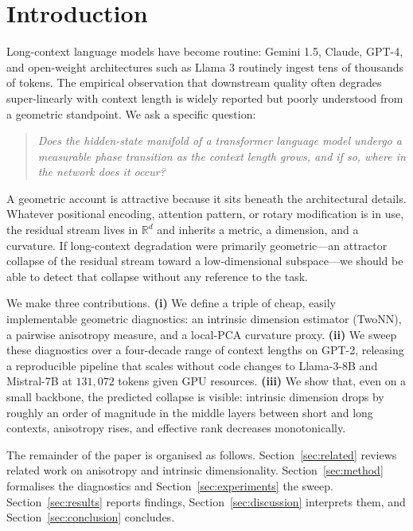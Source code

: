 \section{Introduction}

Long-context language models have become routine: Gemini 1.5, Claude, GPT-4,
and open-weight architectures such as Llama 3 routinely ingest tens of
thousands of tokens. The empirical observation that downstream quality often
degrades super-linearly with context length is widely reported but poorly
understood from a geometric standpoint. We ask a specific question:

\begin{quote}
\emph{Does the hidden-state manifold of a transformer language model undergo
a measurable phase transition as the context length grows, and if so, where
in the network does it occur?}
\end{quote}

A geometric account is attractive because it sits beneath the architectural
details. Whatever positional encoding, attention pattern, or rotary
modification is in use, the residual stream lives in $\mathbb{R}^d$ and
inherits a metric, a dimension, and a curvature. If long-context degradation
were primarily geometric---an attractor collapse of the residual stream
toward a low-dimensional subspace---we should be able to detect that collapse
without any reference to the task.

We make three contributions. \textbf{(i)} We define a triple of cheap, easily
implementable geometric diagnostics: an intrinsic dimension estimator
(TwoNN), a pairwise anisotropy measure, and a local-PCA curvature proxy.
\textbf{(ii)} We sweep these diagnostics over a four-decade range of context
lengths on GPT-2, releasing a reproducible pipeline that scales without code
changes to Llama-3-8B and Mistral-7B at $131{,}072$ tokens given GPU
resources. \textbf{(iii)} We show that, even on a small backbone, the
predicted collapse is visible: intrinsic dimension drops by roughly an order
of magnitude in the middle layers between short and long contexts, anisotropy
rises, and effective rank decreases monotonically.

The remainder of the paper is organised as follows. Section~\ref{sec:related}
reviews related work on anisotropy and intrinsic dimensionality. Section~\ref{sec:method}
formalises the diagnostics and Section~\ref{sec:experiments} the sweep.
Section~\ref{sec:results} reports findings, Section~\ref{sec:discussion}
interprets them, and Section~\ref{sec:conclusion} concludes.
